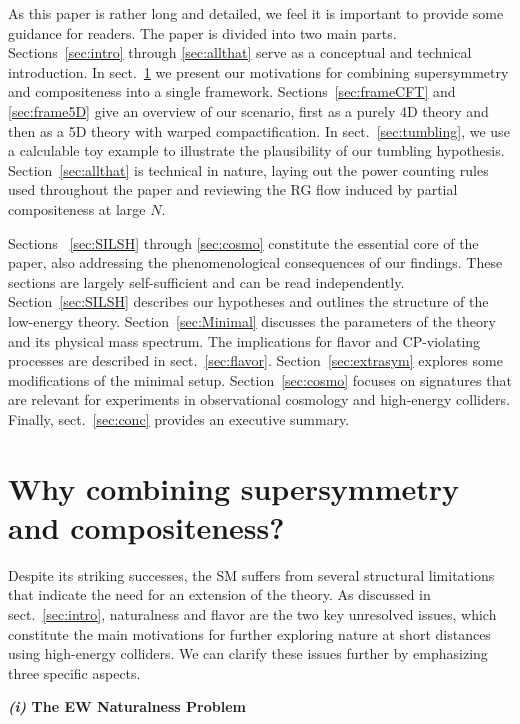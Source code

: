 \documentclass[a4paper,12pt]{article}
\def\sec#1{sect.~\ref{#1}}
\begin{document}
As this paper is rather long and detailed, we feel it is important to provide some guidance for readers. The paper is divided into two main parts. Sections~\ref{sec:intro} through \ref{sec:allthat} serve as a conceptual and technical introduction. In \sec{sec:why} we present our motivations for combining supersymmetry and compositeness into a single framework. Sections~\ref{sec:frameCFT} and \ref{sec:frame5D} give an overview of our scenario, first as a purely 4D theory and then as a 5D theory with
warped compactification. In \sec{sec:tumbling}, we use a calculable toy example to illustrate the plausibility of our tumbling hypothesis. Section~\ref{sec:allthat} is technical in nature, laying out the power counting rules used throughout the paper and reviewing the RG flow induced by partial compositeness at large $N$. 

Sections ~\ref{sec:SILSH} through \ref{sec:cosmo} constitute the essential core of the paper, also addressing the phenomenological consequences of our findings. These sections are largely self-sufficient and can be read independently.
Section~\ref{sec:SILSH} describes our hypotheses and outlines the structure of the low-energy theory. Section~\ref{sec:Minimal} discusses the parameters of the theory and its physical mass spectrum. The implications for flavor and CP-violating processes are described in \sec{sec:flavor}. Section~\ref{sec:extrasym} explores some modifications of the minimal setup. Section~\ref{sec:cosmo} focuses on signatures that are relevant for experiments in observational cosmology and high-energy colliders. Finally, \sec{sec:conc} provides an executive summary.

\section{Why combining supersymmetry and compositeness?}
\label{sec:why}

Despite its striking successes, the SM suffers from several structural limitations that indicate the need for an extension of the theory. As discussed in \sec{sec:intro}, naturalness and flavor are the two key unresolved issues, which constitute the main motivations for further exploring nature at short distances using high-energy colliders. We can clarify these issues further by emphasizing three specific aspects.

\medskip
\textbf{\textit{(i)} The EW Naturalness Problem}
\end{document}

